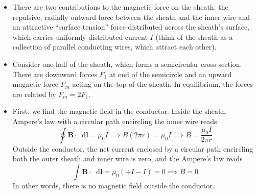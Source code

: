 \documentclass[11pt, a4paper]{article}
\newcommand{\diff}{\mathop{}\!\mathrm{d}} %
\renewcommand{\vec}[1]{\bm{#1}} %
\begin{document}
\begin{itemize}
	\item There are two contributions to the magnetic force on the sheath: the repulsive, radially outward force between the sheath and the inner wire and an attractive ``surface tension'' force distributed across the sheath's surface, which carries uniformly distributed current $ I $ (think of the sheath as a collection of parallel conducting wires, which attract each other).
	
	\item Consider one-half of the sheath, which forms a semicircular cross section. There are downward forces $ F_{1} $ at end of the semicircle and an upward magnetic force $ F_{m} $ acting on the top of the sheath. In equilibrium, the forces are related by $ F_{m} = 2F_{1} $.
	
	\item First, we find the magnetic field in the conductor. Inside the sheath, Ampere's law with a circular path encircling the inner wire reads
	\begin{equation*}
		\oint \vec{B} \cdot \diff \bm{l} = \mu_{0} I \implies B (2\pi r) = \mu_{0}I \implies B = \frac{\mu_{0}I}{2\pi r}
	\end{equation*}
	Outside the conductor, the net current enclosed by a circular path encircling both the outer sheath and inner wire is zero, and the Ampere's law reads
	\begin{equation*}
		\int \vec{B} \cdot \diff \bm{l} = \mu_{0} (+I - I) = 0 \implies B = 0
	\end{equation*}
	In other words, there is no magnetic field outside the conductor.
	

\end{itemize}
\end{document}
